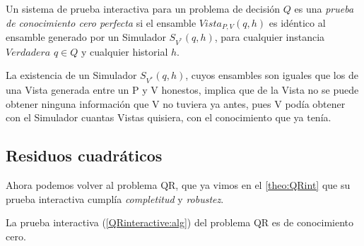 
\begin{definition}
	Un sistema de prueba interactiva para un problema de decisión $Q$ es una \textit{prueba de conocimiento cero perfecta} si el ensamble $Vista_{P,V}(q,h)$ es idéntico al ensamble generado por un Simulador $S_{V^*}(q,h)$, para cualquier instancia $Verdadera$ $q\in Q$ y cualquier historial $h$.
\end{definition}

La existencia de un Simulador $S_{V^*}(q,h)$, cuyos ensambles son iguales que los de una Vista generada entre un P y V honestos, implica que de la Vista no se puede obtener ninguna información que V no tuviera ya antes, pues V podía obtener con el Simulador cuantas Vistas quisiera, con el conocimiento que ya tenía.


\hfil

\subsection{Residuos cuadráticos}

Ahora podemos volver al problema QR, que ya vimos en el \autoref{theo:QRint} que su prueba interactiva cumplía \textit{completitud} y \textit{robustez}.

\begin{theorem}
	La prueba interactiva (\ref{QRinteractive:alg}) del problema QR es de conocimiento cero.
\end{theorem}

